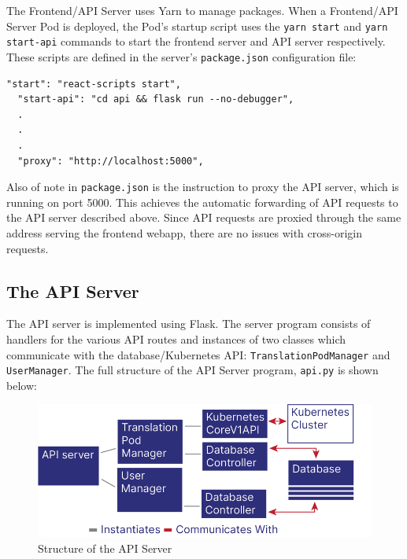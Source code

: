 \documentclass[12pt]{article}
\begin{document}
The Frontend/API Server uses Yarn \cite{yarn} to manage packages.
When a Frontend/API Server Pod is deployed, the Pod's startup script
uses the \lstinline{yarn start} and \lstinline{yarn start-api}
commands to start the frontend server and API server respectively.
These scripts are defined in the server's \lstinline{package.json}
configuration file:

\begin{lstlisting}[basicstyle=\linespread{0.5}\ttfamily,caption={Frontend/API Server Configuration},captionpos=b]
  "start": "react-scripts start",
  "start-api": "cd api && flask run --no-debugger",
  .
  .
  .
  "proxy": "http://localhost:5000",
\end{lstlisting}

Also of note in \lstinline{package.json} is the instruction to proxy
the API server, which is running on port 5000.  This achieves the
automatic forwarding of API requests to the API server described
above.  Since API requests are proxied through the same address
serving the frontend webapp, there are no issues with cross-origin
requests.

\subsection{The API Server}

The API server is implemented using Flask.  The server program
consists of handlers for the various API routes and instances of two
classes which communicate with the database/Kubernetes API:
\lstinline{TranslationPodManager} and \lstinline{UserManager}.  The
full structure of the API Server program, \lstinline{api.py} is shown
below:

\begin{figure}[h!]

  \includegraphics[scale=1]{api_structure}
  \centering
  \caption{Structure of the API Server}
  \label{rr:detailed}
\end{figure}
\end{document}

